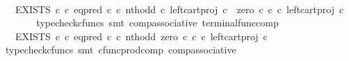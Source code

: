 \begin{isabellebody}
\ \ \isamarkupfalse%
\ \isamarkupfalse%
\ {\isachardoublequoteopen}{\isachardot}{\kern0pt}{\isachardot}{\kern0pt}{\isachardot}{\kern0pt}\ {\isacharequal}{\kern0pt}\ EXISTS\ {\isasymnat}\isactrlsub c\ {\isasymcirc}\isactrlsub c\ {\isacharparenleft}{\kern0pt}eq{\isacharunderscore}{\kern0pt}pred\ {\isasymnat}\isactrlsub c\ {\isasymcirc}\isactrlsub c\ {\isasymlangle}nth{\isacharunderscore}{\kern0pt}odd\ {\isasymcirc}\isactrlsub c\ left{\isacharunderscore}{\kern0pt}cart{\isacharunderscore}{\kern0pt}proj\ {\isasymnat}\isactrlsub c\ {\isasymone}{\isacharcomma}{\kern0pt}\ {\isacharparenleft}{\kern0pt}zero\ {\isasymcirc}\isactrlsub c\ {\isasymbeta}\isactrlbsub {\isasymnat}\isactrlsub c\isactrlesub {\isacharparenright}{\kern0pt}\ {\isasymcirc}\isactrlsub c\ left{\isacharunderscore}{\kern0pt}cart{\isacharunderscore}{\kern0pt}proj\ {\isasymnat}\isactrlsub c\ {\isasymone}{\isasymrangle}\ {\isacharparenright}{\kern0pt}\isactrlsup {\isasymsharp}{\isachardoublequoteclose}\isanewline
\ \ \ \ \isamarkupfalse%
\ {\isacharparenleft}{\kern0pt}typecheck{\isacharunderscore}{\kern0pt}cfuncs{\isacharcomma}{\kern0pt}\ smt\ comp{\isacharunderscore}{\kern0pt}associative{}\ terminal{\isacharunderscore}{\kern0pt}func{\isacharunderscore}{\kern0pt}comp{\isacharparenright}{\kern0pt}\isanewline
\ \ \isamarkupfalse%
\ \isamarkupfalse%
\ {\isachardoublequoteopen}{\isachardot}{\kern0pt}{\isachardot}{\kern0pt}{\isachardot}{\kern0pt}\ {\isacharequal}{\kern0pt}\ EXISTS\ {\isasymnat}\isactrlsub c\ {\isasymcirc}\isactrlsub c\ {\isacharparenleft}{\kern0pt}{\isacharparenleft}{\kern0pt}eq{\isacharunderscore}{\kern0pt}pred\ {\isasymnat}\isactrlsub c\ {\isasymcirc}\isactrlsub c\ {\isasymlangle}nth{\isacharunderscore}{\kern0pt}odd{\isacharcomma}{\kern0pt}\ zero\ {\isasymcirc}\isactrlsub c\ {\isasymbeta}\isactrlbsub {\isasymnat}\isactrlsub c\isactrlesub {\isasymrangle}{\isacharparenright}{\kern0pt}\ {\isasymcirc}\isactrlsub c\ left{\isacharunderscore}{\kern0pt}cart{\isacharunderscore}{\kern0pt}proj\ {\isasymnat}\isactrlsub c\ {\isasymone}{\isacharparenright}{\kern0pt}\isactrlsup {\isasymsharp}{\isachardoublequoteclose}\isanewline
\ \ \ \ \isamarkupfalse%
\ {\isacharparenleft}{\kern0pt}typecheck{\isacharunderscore}{\kern0pt}cfuncs{\isacharcomma}{\kern0pt}\ smt\ cfunc{\isacharunderscore}{\kern0pt}prod{\isacharunderscore}{\kern0pt}comp\ comp{\isacharunderscore}{\kern0pt}associative{}{\isacharparenright}{\kern0pt}\isanewline
\ \ \isamarkupfalse%
\ \isamarkupfalse%

\end{isabellebody}
